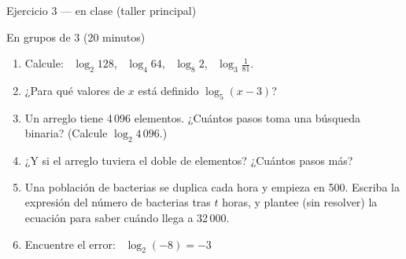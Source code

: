 \documentclass[aspectratio=169,10pt]{beamer}
\begin{document}
\begin{frame}{Ejercicio 3 — en clase (taller principal)}
  \begin{alertblock}{En grupos de 3 (20 minutos)}
    \tiny
    \begin{enumerate}\setlength{\itemsep}{0.05cm}
      \item Calcule: \ $\log_{2}128$, \ $\log_{4}64$, \ $\log_{8}2$, \
            $\log_{3}\tfrac{1}{81}$.
      \item ¿Para qué valores de $x$ está definido $\log_{5}(x-3)$?
      \item Un arreglo tiene 4\,096 elementos. ¿Cuántos pasos toma una búsqueda
            binaria? (Calcule $\log_{2}4\,096$.)
      \item ¿Y si el arreglo tuviera el doble de elementos? ¿Cuántos pasos
            más?
      \item Una población de bacterias se duplica cada hora y empieza en 500.
            Escriba la expresión del número de bacterias tras $t$ horas, y
            plantee (sin resolver) la ecuación para saber cuándo llega a
            32\,000.
      \item Encuentre el error: \ $\log_{2}(-8) = -3$
    \end{enumerate}
  \end{alertblock}
\end{frame}
\end{document}

